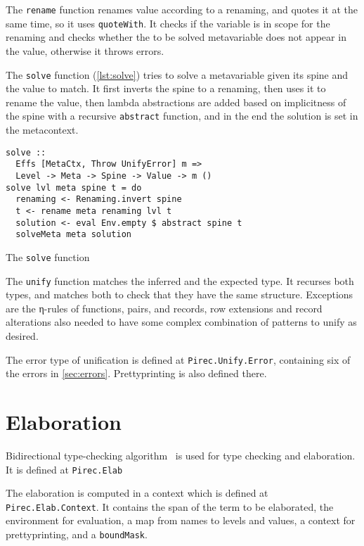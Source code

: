 The \texttt{rename} function renames value according to a renaming, and
quotes it at the same time, so it uses \texttt{quoteWith}. It checks if
the variable is in scope for the renaming and checks whether the to be solved
metavariable does not appear in the value, otherwise it throws errors.

The \texttt{solve} function (\cref{lst:solve}) tries to solve a
metavariable given its spine and the value to match. It first inverts the spine
to a renaming, then uses it to rename the value, then lambda abstractions are
added based on implicitness of the spine with a recursive
\texttt{abstract} function, and in the end the solution is set in the
metacontext.

\begin{listing}
  \begin{verbatim}
solve ::
  Effs [MetaCtx, Throw UnifyError] m =>
  Level -> Meta -> Spine -> Value -> m ()
solve lvl meta spine t = do
  renaming <- Renaming.invert spine
  t <- rename meta renaming lvl t
  solution <- eval Env.empty $ abstract spine t
  solveMeta meta solution
  \end{verbatim}
  \caption{The \texttt{solve} function}\label{lst:solve}
\end{listing}

The \texttt{unify} function matches the inferred and the expected type.
It recurses both types, and matches both to check that they have the same
structure. Exceptions are the η-rules of functions, pairs, and records, row
extensions and record alterations also needed to have some complex combination
of patterns to unify as desired.

The error type of unification is defined at \texttt{Pirec.Unify.Error},
containing six of the errors in \cref{sec:errors}. Prettyprinting is also
defined there.

\section{Elaboration}\label{sec:elab}

Bidirectional type-checking algorithm~\cite{deptypecheck, lambdapi} is used for
type checking and elaboration. It is defined at \texttt{Pirec.Elab}

The elaboration is computed in a context which is defined at
\texttt{Pirec.Elab.Context}. It contains the span of the term to be elaborated,
the environment for evaluation, a map from names to levels and values, a context
for prettyprinting, and a \texttt{boundMask}.

